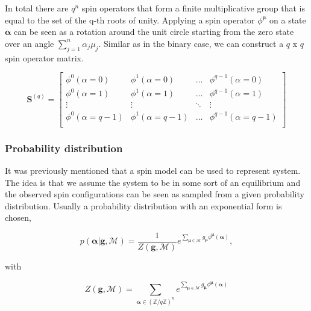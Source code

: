 \noindent
In total there are $q^n$ spin operators that form a finite multiplicative group that is equal to the set of the q-th roots of unity.
Applying a spin operator $\phi^{\boldsymbol{\mu}}$ on a state $\boldsymbol{\alpha}$ can be seen as a rotation around the unit circle starting from the zero state over an angle $\sum_{j=1}^{n}  \alpha_j \mu_j$.
Similar as in the binary case, we can construct a $q$ x $q$ spin operator matrix.

\begin{equation}
    \mathbf{S}^{(q)} = \begin{bmatrix}
        \phi^0(\alpha=0) & \phi^1(\alpha=0) & \hdots &  \phi^{q-1}(\alpha=0)\\
        \phi^0(\alpha=1) & \phi^1(\alpha=1) & \hdots &  \phi^{q-1}(\alpha=1)\\
        \vdots & \vdots & \ddots & \vdots \\
        \phi^0(\alpha=q-1) & \phi^1(\alpha=q-1) & \hdots & \phi^{q-1}(\alpha=q-1)\\
    \end{bmatrix}\label{eq:spin_op_matrix}
\end{equation}

\subsubsection{Probability distribution}

\noindent
It was previously mentioned that a spin model can be used to represent system. The idea is that we assume the system to be in some sort of an equilibrium and the observed spin configurations can be seen as sampled from a given probability distribution.
Usually a probability distribution with an exponential form is chosen,

\begin{equation}\label{eq:prob_distr}
    p(\boldsymbol{\alpha}| \mathbf{g}, \mathcal{M}) = \frac{1}{Z(\mathbf{g}, \mathcal{M})} e^{\sum_{\boldsymbol{\mu} \in \mathcal{M}} g_{\boldsymbol{\mu}} \phi^{\boldsymbol{\mu}}(\boldsymbol{\alpha})},
\end{equation}

\noindent
with

\begin{equation}
    Z(\mathbf{g}, \mathcal{M}) = \sum_{\boldsymbol{\alpha} \in {(\mathbb{Z}/q\mathbb{Z})}^n}e^{\sum_{\boldsymbol{\mu} \in \mathcal{M}} g_{\boldsymbol{\mu}} \phi^{\boldsymbol{\mu}}(\boldsymbol{\alpha})}
\end{equation}

